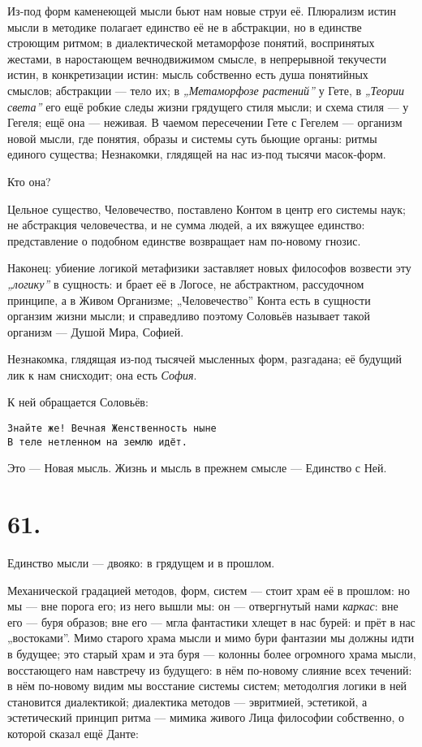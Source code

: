 \documentclass[12pt,a4paper,oneside]{book}
\begin{document}
Из-под форм каменеющей мысли бьют нам новые струи её. Плюрализм истин мысли в методике полагает единство её не в абстракции, но в единстве строющим ритмом; в диалектической метаморфозе понятий, воспринятых жестами, в наростающем вечнодвижимом смысле, в непрерывной текучести истин, в конкретизации истин: мысль собственно есть душа понятийных смыслов; абстракции — тело их; в \emph{„Метаморфозе растений”} у Гете, в \emph{„Теории света”} его ещё робкие следы жизни грядущего стиля мысли; и схема стиля — у Гегеля; ещё она — неживая. В чаемом пересечении Гете с Гегелем — организм новой мысли, где понятия, образы и системы суть бьющие органы: ритмы единого существа; Незнакомки, глядящей на нас из-под тысячи масок-форм.

Кто она?

Цельное существо, Человечество, поставлено Контом в центр его системы наук; не абстракция человечества, и не сумма людей, а их вяжущее единство: представление о подобном единстве возвращает нам по-новому гнозис.

Наконец: убиение логикой метафизики заставляет новых философов возвести эту \emph{„логику”} в сущность: и брает её в Логосе, не абстрактном, рассудочном принципе, а в Живом Организме; „Человечество” Конта есть в сущности органзим жизни мысли; и справедливо поэтому Соловьёв называет такой организм — Душой Мира, Софией.

Незнакомка, глядящая из-под тысячей мысленных форм, разгадана; её будущий лик к нам снисходит; она есть \emph{София}.

К ней обращается Соловьёв:

\begin{Verbatim}
Знайте же! Вечная Женственность ныне
В теле нетленном на землю идёт.
\end{Verbatim}

Это — Новая мысль. Жизнь и мысль в прежнем смысле — Единство с Ней.

\section*{61.}

Единство мысли — двояко: в грядущем и в прошлом.

Механической градацией методов, форм, систем — стоит храм её в прошлом: но мы — вне порога его; из него вышли мы: он — отвергнутый нами \emph{каркас}: вне его — буря образов; вне его — мгла фантастики хлещет в нас бурей: и прёт в нас „востоками”. Мимо старого храма мысли и мимо бури фантазии мы должны идти в будущее; это старый храм и эта буря — колонны более огромного храма мысли, восстающего нам навстречу из будущего: в нём по-новому слияние всех течений: в нём по-новому видим мы восстание системы систем; методолгия логики в ней становится диалектикой; диалектика методов — эвритмией, эстетикой, а эстетический принцип ритма — мимика живого Лица философии собственно, о которой сказал ещё Данте:
\end{document}
